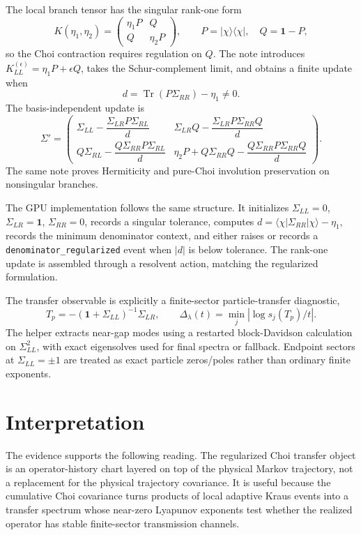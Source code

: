 \documentclass[aps,prb,onecolumn,nofootinbib,superscriptaddress]{revtex4-2}
\newcommand{\Tr}{\operatorname{Tr}}
\newcommand{\I}{\mathbf{1}}
\newcommand{\ket}[1]{\lvert #1\rangle}
\newcommand{\bra}[1]{\langle #1\rvert}
\begin{document}
The local branch tensor has the singular rank-one form
\[
K(\eta_1,\eta_2)=
\begin{pmatrix}
\eta_1 P & Q\\
Q & \eta_2 P
\end{pmatrix},
\qquad
P=\ket{\chi}\bra{\chi},\quad Q=\I-P ,
\]
so the Choi contraction requires regulation on \(Q\).  The note introduces
\(K_{LL}^{(\epsilon)}=\eta_1P+\epsilon Q\), takes the Schur-complement limit,
and obtains a finite update when
\[
d=\Tr(P\Sigma_{RR})-\eta_1\neq 0.
\]
The basis-independent update is
\[
\Sigma'=
\begin{pmatrix}
\Sigma_{LL}-\dfrac{\Sigma_{LR}P\Sigma_{RL}}{d}
&
\Sigma_{LR}Q-\dfrac{\Sigma_{LR}P\Sigma_{RR}Q}{d}
\\[8pt]
Q\Sigma_{RL}-\dfrac{Q\Sigma_{RR}P\Sigma_{RL}}{d}
&
\eta_2P+Q\Sigma_{RR}Q-\dfrac{Q\Sigma_{RR}P\Sigma_{RR}Q}{d}
\end{pmatrix}.
\]
The same note proves Hermiticity and pure-Choi involution preservation on
nonsingular branches.

The GPU implementation follows the same structure.  It initializes
\(\Sigma_{LL}=0\), \(\Sigma_{LR}=\I\), \(\Sigma_{RR}=0\), records a singular
tolerance, computes \(d=\bra{\chi}\Sigma_{RR}\ket{\chi}-\eta_1\), records the
minimum denominator context, and either raises or records a
\texttt{denominator\_regularized} event when \(|d|\) is below tolerance.  The
rank-one update is assembled through a resolvent action, matching the
regularized formulation.

The transfer observable is explicitly a finite-sector particle-transfer
diagnostic,
\[
T_p=-(\I+\Sigma_{LL})^{-1}\Sigma_{LR},
\qquad
\Delta_\lambda(t)=\min_j |\log s_j(T_p)/t|.
\]
The helper extracts near-gap modes using a restarted block-Davidson calculation
on \(\Sigma_{LL}^2\), with exact eigensolves used for final spectra or fallback.
Endpoint sectors at \(\Sigma_{LL}=\pm1\) are treated as exact particle
zeros/poles rather than ordinary finite exponents.

\section{Interpretation}

The evidence supports the following reading.  The regularized Choi transfer
object is an operator-history chart layered on top of the physical Markov
trajectory, not a replacement for the physical trajectory covariance.  It is
useful because the cumulative Choi covariance turns products of local adaptive
Kraus events into a transfer spectrum whose near-zero Lyapunov exponents test
whether the realized operator has stable finite-sector transmission channels.
\end{document}
